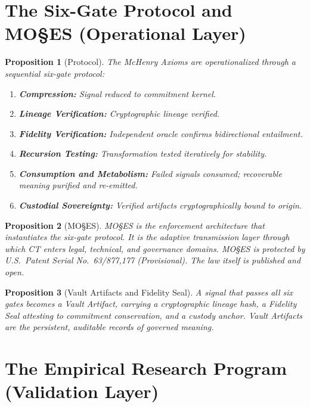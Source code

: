 \documentclass[11pt,a4paper]{article}
\newtheorem{proposition}{Proposition}[section]
\begin{document}
\section{The Six-Gate Protocol and MO\S{}ES\texttrademark{} (Operational Layer)}

\begin{proposition}[Protocol]
The McHenry Axioms are operationalized through a sequential six-gate protocol:
\begin{enumerate}[leftmargin=*,nosep]
    \item \textbf{Compression:} Signal reduced to commitment kernel.
    \item \textbf{Lineage Verification:} Cryptographic lineage verified.
    \item \textbf{Fidelity Verification:} Independent oracle confirms bidirectional entailment.
    \item \textbf{Recursion Testing:} Transformation tested iteratively for stability.
    \item \textbf{Consumption and Metabolism:} Failed signals consumed; recoverable meaning purified and re-emitted.
    \item \textbf{Custodial Sovereignty:} Verified artifacts cryptographically bound to origin.
\end{enumerate}
\end{proposition}

\begin{proposition}[MO\S{}ES\texttrademark{}]
MO\S{}ES\texttrademark{} is the enforcement architecture that instantiates the six-gate protocol. It is the adaptive transmission layer through which CT enters legal, technical, and governance domains. MO\S{}ES\texttrademark{} is protected by U.S.\ Patent Serial No.\ 63/877,177 (Provisional). The law itself is published and open.
\end{proposition}

\begin{proposition}[Vault Artifacts and Fidelity Seal]
A signal that passes all six gates becomes a Vault Artifact, carrying a cryptographic lineage hash, a Fidelity Seal attesting to commitment conservation, and a custody anchor. Vault Artifacts are the persistent, auditable records of governed meaning.
\end{proposition}

\section{The Empirical Research Program (Validation Layer)}
\end{document}
